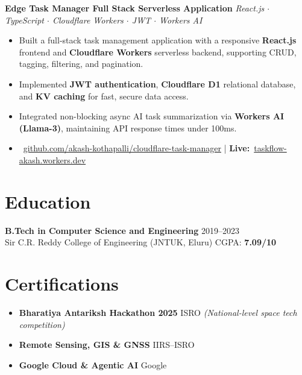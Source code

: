 \documentclass[a4paper,10pt]{article}
\newcommand{\iconbadge}[1]{%
  \tikz[baseline=-0.55ex]{\node[circle,fill=myblue,text=white,font=\bfseries\fontsize{5}{5}\selectfont,inner sep=1.3pt,minimum size=10pt]{#1};}%
}
\newcommand{\projectHeading}[2]{
  \vspace{0.08cm}\noindent\textbf{#1} \hfill \textit{#2}\par\vspace{0.03cm}
}
\begin{document}
\projectHeading{Edge Task Manager \textemdash{} Full Stack Serverless Application}{React.js $\cdot$ TypeScript $\cdot$ Cloudflare Workers $\cdot$ JWT $\cdot$ Workers AI}
\begin{itemize}
\item Built a full-stack task management application with a responsive \textbf{React.js} frontend and \textbf{Cloudflare Workers} serverless backend, supporting CRUD, tagging, filtering, and pagination.
\item Implemented \textbf{JWT authentication}, \textbf{Cloudflare D1} relational database, and \textbf{KV caching} for fast, secure data access.
\item Integrated non-blocking async AI task summarization via \textbf{Workers AI (Llama-3)}, maintaining API response times under 100ms.
\item \iconbadge{gh}~\href{https://github.com/akash-kothapalli/cloudflare-task-manager}{github.com/akash-kothapalli/cloudflare-task-manager}
  \enspace\textcolor{myblue}{|}\enspace
  \textbf{Live:}~\href{https://cloudflare-task-manager.taskflow-akash.workers.dev}{taskflow-akash.workers.dev}
\end{itemize}

\section*{Education}
\textbf{B.Tech in Computer Science and Engineering} \hfill 2019--2023\\
Sir C.R. Reddy College of Engineering (JNTUK, Eluru) \hfill CGPA: \textbf{7.09/10}

\section*{Certifications}
\begin{itemize}
\item \textbf{Bharatiya Antariksh Hackathon 2025} \textemdash{} ISRO \textit{(National-level space tech competition)}
\item \textbf{Remote Sensing, GIS \& GNSS} \textemdash{} IIRS--ISRO
\item \textbf{Google Cloud \& Agentic AI} \textemdash{} Google
\end{itemize}
\end{document}
